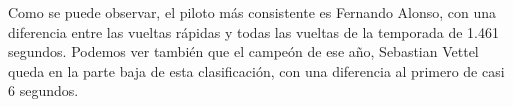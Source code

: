 \documentclass[12pt,twoside,titlepage]{report}
\begin{document}
Como se puede observar, el piloto más consistente es Fernando Alonso, con una diferencia entre las vueltas rápidas y todas las vueltas de la temporada de 1.461 segundos. Podemos ver también que el campeón de ese año, Sebastian Vettel queda en la parte baja de esta clasificación, con una diferencia al primero de casi 6 segundos.



\end{document}
